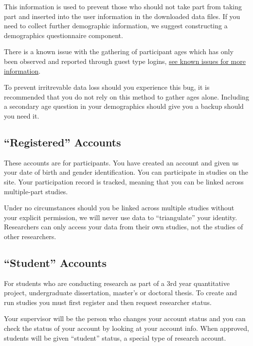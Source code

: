\documentclass[]{book}
\begin{document}
This information is used to prevent those who should not take part from
taking part and inserted into the user information in the downloaded
data files. If you need to collect further demographic information, we
suggest constructing a demographics questionnaire component.

\begin{bug}
There is a known issue with the gathering of participant ages which has
only been observed and reported through guest type logins,
\protect\hyperlink{user_age}{see known issues for more information}.

To prevent irritrevable data loss should you experience this bug, it is
recommended that you do not rely on this method to gather ages alone.
Including a secondary age question in your demographics should give you
a backup should you need it.
\end{bug}

\subsection{\texorpdfstring{``Registered''
Accounts}{Registered Accounts}}\label{registered-accounts}

These accounts are for participants. You have created an account and
given us your date of birth and gender identification. You can
participate in studies on the site. Your participation record is
tracked, meaning that you can be linked across multiple-part studies.

Under no circumstances should you be linked across multiple studies
without your explicit permission, we will never use data to
``triangulate'' your identity. Researchers can only access your data
from their own studies, not the studies of other researchers.

\subsection{\texorpdfstring{``Student''
Accounts}{Student Accounts}}\label{student-accounts}

For students who are conducting research as part of a 3rd year
quantitative project, undergraduate dissertation, master's or doctoral
thesis. To create and run studies you must first register and then
request researcher status.

Your supervisor will be the person who changes your account status and
you can check the status of your account by looking at your account
info. When approved, students will be given ``student'' status, a
special type of research account.
\end{document}

